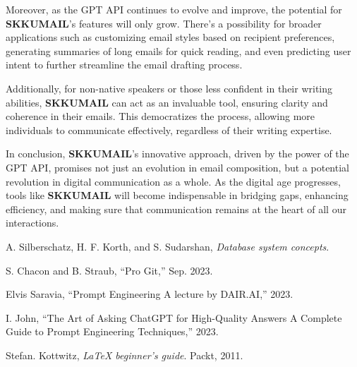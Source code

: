\documentclass[12pt]{article}
\begin{document}
Moreover, as the GPT API continues to evolve and improve, the potential for \textbf{SKKUMAIL}'s features will only grow. There's a possibility for broader applications such as customizing email styles based on recipient preferences, generating summaries of long emails for quick reading, and even predicting user intent to further streamline the email drafting process.

Additionally, for non-native speakers or those less confident in their writing abilities, \textbf{SKKUMAIL} can act as an invaluable tool, ensuring clarity and coherence in their emails. This democratizes the process, allowing more individuals to communicate effectively, regardless of their writing expertise.

In conclusion, \textbf{SKKUMAIL}'s innovative approach, driven by the power of the GPT API, promises not just an evolution in email composition, but a potential revolution in digital communication as a whole. As the digital age progresses, tools like \textbf{SKKUMAIL} will become indispensable in bridging gaps, enhancing efficiency, and making sure that communication remains at the heart of all our interactions.


\begin{thebibliography}{99}
		
	A. Silberschatz, H. F. Korth, and S. Sudarshan, 
	\textit{Database system concepts}.
		
	S. Chacon and B. Straub, 
	``Pro Git,'' 
	Sep. 2023.
		
	Elvis Saravia, 
	``Prompt Engineering A lecture by DAIR.AI,'' 
	2023.
		
	I. John, 
	``The Art of Asking ChatGPT for High-Quality Answers A Complete Guide to Prompt Engineering Techniques,'' 
	2023.
		
	Stefan. Kottwitz, 
	\textit{LaTeX beginner’s guide}. 
	Packt, 2011.
		
\end{thebibliography}
\end{document}
